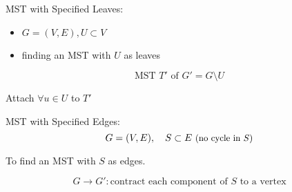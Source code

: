 \begin{frame}{}
  \begin{exampleblock}{MST with Specified Leaves: }
    \begin{itemize}
      \item $G = (V, E), U \subset V$
      \item finding an MST with $U$ as leaves
    \end{itemize}
  \end{exampleblock}

  \pause

  \vspace{-0.30cm}
  \[
    \text{MST } T' \text{ of } G' = G \setminus U
  \]

  \pause
  \centerline{Attach $\forall u \in U$ to $T'$ {}}
\end{frame}

\begin{frame}{}
  \begin{block}{MST with Specified Edges: }
    \[
      G = (V,E),\quad S \subset E \text{ \small (no cycle in $S$)}
    \]
    
    \centerline{To find an MST with $S$ as edges.}
  \end{block}

  \pause
  \[
    G \to G': \text{contract each component of $S$ to a vertex}
  \]
\end{frame}
